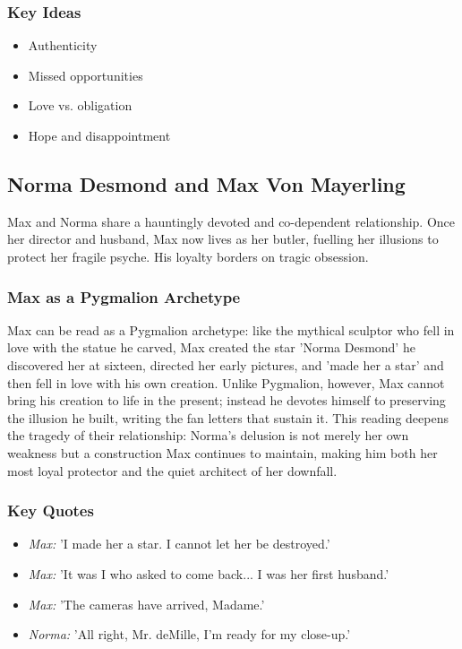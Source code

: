 \documentclass[a4paper]{article}
\begin{document}
\subsubsection*{Key Ideas}
\begin{itemize}
    \item Authenticity
    \item Missed opportunities
    \item Love vs. obligation
    \item Hope and disappointment
\end{itemize}

\subsection{Norma Desmond and Max Von Mayerling}
Max and Norma share a hauntingly devoted and co-dependent relationship. Once her director and husband, Max now lives as her butler, fuelling her illusions to protect her fragile psyche. His loyalty borders on tragic obsession.

\subsubsection*{Max as a Pygmalion Archetype}
Max can be read as a Pygmalion archetype: like the mythical sculptor who fell in love with the statue he carved, Max created the star 'Norma Desmond' \textemdash{} he discovered her at sixteen, directed her early pictures, and 'made her a star' \textemdash{} and then fell in love with his own creation. Unlike Pygmalion, however, Max cannot bring his creation to life in the present; instead he devotes himself to preserving the illusion he built, writing the fan letters that sustain it. This reading deepens the tragedy of their relationship: Norma's delusion is not merely her own weakness but a construction Max continues to maintain, making him both her most loyal protector and the quiet architect of her downfall.

\subsubsection*{Key Quotes}
\begin{itemize}
    \item \textit{Max:} 'I made her a star. I cannot let her be destroyed.'
    \item \textit{Max:} 'It was I who asked to come back... I was her first husband.'
    \item \textit{Max:} 'The cameras have arrived, Madame.'
    \item \textit{Norma:} 'All right, Mr. deMille, I'm ready for my close-up.'
\end{itemize}
\end{document}
